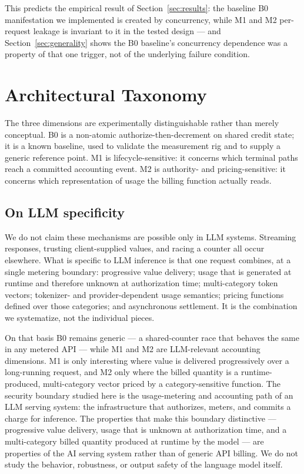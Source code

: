 \documentclass[preprint,3p,authoryear,12pt]{elsarticle}
\begin{document}
This predicts the empirical result of Section~\ref{sec:results}: the baseline B0
manifestation we implemented is created by concurrency, while M1 and M2 per-request
leakage is invariant to it in the tested design --- and Section~\ref{sec:generality}
shows the B0 baseline's concurrency dependence was a property of that one trigger, not
of the underlying failure condition.

\section{Architectural Taxonomy}
\label{sec:taxonomy}
The three dimensions are experimentally distinguishable rather than merely conceptual. B0
is a non-atomic authorize-then-decrement on shared credit state; it is a known baseline,
used to validate the measurement rig and to supply a generic reference point. M1 is
lifecycle-sensitive: it concerns which terminal paths reach a committed accounting event.
M2 is authority- and pricing-sensitive: it concerns which representation of usage the
billing function actually reads.

\subsection{On LLM specificity}
We do not claim these mechanisms are possible only in LLM systems. Streaming responses,
trusting client-supplied values, and racing a counter all occur elsewhere. What is
specific to LLM inference is that one request combines, at a single metering boundary:
progressive value delivery; usage that is generated at runtime and therefore unknown at
authorization time; multi-category token vectors; tokenizer- and provider-dependent usage
semantics; pricing functions defined over those categories; and asynchronous settlement.
It is the combination we systematize, not the individual pieces.

On that basis B0 remains generic --- a shared-counter race that behaves the same in any
metered API --- while M1 and M2 are LLM-relevant accounting dimensions. M1 is only
interesting where value is delivered progressively over a long-running request, and M2
only where the billed quantity is a runtime-produced, multi-category vector priced by a
category-sensitive function. The security boundary studied here is the usage-metering and
accounting path of an LLM serving system: the infrastructure that authorizes, meters,
and commits a charge for inference. The properties that make this boundary distinctive
--- progressive value delivery, usage that is unknown at authorization time, and a
multi-category billed quantity produced at runtime by the model --- are properties of
the AI serving system rather than of generic API billing. We do not study the behavior,
robustness, or output safety of the language model itself.
\end{document}
